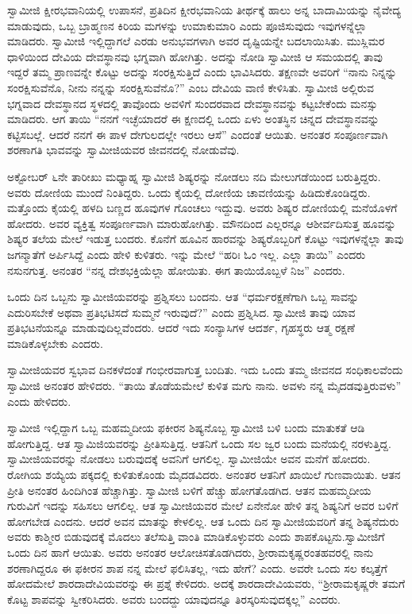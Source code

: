 \vskip 2pt

 ಸ್ವಾಮೀಜಿ ಕ್ಷೀರಭವಾನಿಯಲ್ಲಿ ಉಪಾಸನೆ, ಪ್ರತಿದಿನ ಕ್ಷೀರಭವಾನಿಯ ತೀರ್ಥಕ್ಕೆ ಹಾಲು ಅನ್ನ ಬಾದಾಮಿಯನ್ನು ನೈವೇದ್ಯ ಮಾಡುವುದು, ಒಬ್ಬ ಬ್ರಾಹ್ಮಣನ ಕಿರಿಯ ಮಗಳನ್ನು ಉಮಾಕುಮಾರಿ ಎಂದು ಪೂಜಿಸುವುದು ಇವುಗಳನ್ನೆಲ್ಲಾ ಮಾಡಿದರು. ಸ್ವಾಮೀಜಿ ಇಲ್ಲಿದ್ದಾಗಲೆ ಎರಡು ಅನುಭವಗಳಾಗಿ ಅವರ ದೃಷ್ಟಿಯನ್ನೇ ಬದಲಾಯಿಸಿತು. ಮುಸ್ಲಿಮರ ಧಾಳಿಯಿಂದ ದೇವಿಯ ದೇವಸ್ಥಾನವು ಭಗ್ನವಾಗಿ ಹೋಗಿತ್ತು. ಅದನ್ನು ನೋಡಿ ಸ್ವಾಮೀಜಿ ಆ ಸಮಯದಲ್ಲಿ ತಾವು ಇದ್ದರೆ ತಮ್ಮ ಪ್ರಾಣವನ್ನೇ ಕೊಟ್ಟು ಅದನ್ನು ಸಂರಕ್ಷಿಸುತ್ತಿದೆ ಎಂದು ಭಾವಿಸಿದರು. ತಕ್ಷಣವೇ ಅವರಿಗೆ “ನಾನು ನಿನ್ನನ್ನು ಸಂರಕ್ಷಿಸುವೆನೊ, ನೀನು ನನ್ನನ್ನು ಸಂರಕ್ಷಿಸುವೆನೊ?” ಎಂಬ ದೇವಿಯ ವಾಣಿ ಕೇಳಿಸಿತು. ಸ್ವಾಮೀಜಿ ಅಲ್ಲಿರುವ ಭಗ್ನವಾದ ದೇವಸ್ಥಾನದ ಸ್ಥಳದಲ್ಲಿ ತಾವೊಂದು ಅವಳಿಗೆ ಸುಂದರವಾದ ದೇವಸ್ಥಾನವನ್ನು ಕಟ್ಟಬೇಕೆಂದು ಮನಸ್ಸು ಮಾಡಿದರು. ಆಗ ತಾಯಿ “ನನಗೆ ಇಚ್ಛೆಯಾದರೆ ಈ ಕ್ಷಣದಲ್ಲಿ ಒಂದು ಏಳು ಅಂತಸ್ಥಿನ ಚಿನ್ನದ ದೇವಸ್ಥಾನವನ್ನು ಕಟ್ಟಿಸಬಲ್ಲೆ. ಆದರೆ ನನಗೆ ಈ ಪಾಳ ದೇಗುಲದಲ್ಲೇ ಇರಲು ಆಸೆ” ಎಂದಂತೆ ಆಯಿತು. ಅನಂತರ ಸಂಪೂರ್ಣವಾಗಿ ಶರಣಾಗತಿ ಭಾವವನ್ನು ಸ್ವಾಮೀಜಿಯವರ ಜೀವನದಲ್ಲಿ ನೋಡುವೆವು. 

 ಅಕ್ಟೋಬರ್ ೬ನೇ ತಾರೀಖು ಮಧ್ಯಾಹ್ನ ಸ್ವಾಮೀಜಿ ಶಿಷ್ಯರನ್ನು ನೋಡಲು ನದಿ ಮೇಲುಗಡೆಯಿಂದ ಬರುತ್ತಿದ್ದರು. ಅವರು ದೋಣಿಯ ಮುಂದೆ ನಿಂತಿದ್ದರು. ಒಂದು ಕೈಯಲ್ಲಿ ದೋಣಿಯ ಚಾವಣಿಯನ್ನು ಹಿಡಿದುಕೊಂಡಿದ್ದರು. ಮತ್ತೊಂದು ಕೈಯಲ್ಲಿ ಹಳದಿ ಬಣ್ಣದ ಹೂವುಗಳ ಗೊಂಚಲು ಇದ್ದುವು. ಅವರು ಶಿಷ್ಯರ ದೋಣಿಯಲ್ಲಿ ಮನೆಯೊಳಗೆ ಹೋದರು. ಅವರ ವ್ಯಕ್ತಿತ್ವ ಸಂಪೂರ್ಣವಾಗಿ ಮಾರುಹೋಗಿತ್ತು. ಮೌನದಿಂದ ಎಲ್ಲರನ್ನೂ ಆಶೀರ್ವದಿಸುತ್ತ ಹೂವನ್ನು ಶಿಷ್ಯರ ತಲೆಯ ಮೇಲೆ ಇಡುತ್ತ ಬಂದರು. ಕೊನೆಗೆ ಹೂವಿನ ಹಾರವನ್ನು ಶಿಷ್ಯರೊಬ್ಬರಿಗೆ ಕೊಟ್ಟು ಇವುಗಳನ್ನೆಲ್ಲಾ ತಾವು ಜಗನ್ಮಾತೆಗೆ ಅರ್ಪಿಸಿದ್ದೆ ಎಂದು ಹೇಳಿ ಕುಳಿತರು. ಇನ್ನು ಮೇಲೆ “ಹರಿಃ ಓಂ ಇಲ್ಲ. ಎಲ್ಲಾ ತಾಯಿ” ಎಂದರು ನಸುನಗುತ್ತ. ಅನಂತರ “ನನ್ನ ದೇಶಭಕ್ತಿಯೆಲ್ಲಾ ಹೋಯಿತು. ಈಗ ತಾಯಿಯೊಬ್ಬಳೆ ನಿಜ” ಎಂದರು. 

 ಒಂದು ದಿನ ಒಬ್ಬನು ಸ್ವಾಮೀಜಿಯವರನ್ನು ಪ್ರಶ್ನಿಸಲು ಬಂದನು. ಆತ “ಧರ್ಮರಕ್ಷಣೆಗಾಗಿ ಒಬ್ಬ ಸಾವನ್ನು ಎದುರಿಸಬೇಕೆ ಅಥವಾ ಪ್ರತಿಭಟಿಸದೆ ಸುಮ್ಮನೆ ಇರುವುದೆ?” ಎಂದು ಪ್ರಶ್ನಿಸಿದ. ಸ್ವಾಮೀಜಿ ತಾವು ಯಾವ ಪ್ರತಿಭಟನೆಯನ್ನೂ ಮಾಡುವುದಿಲ್ಲವೆಂದರು. ಆದರೆ ಇದು ಸಂನ್ಯಾಸಿಗಳ ಆದರ್ಶ, ಗೃಹಸ್ಥರು ಆತ್ಮ ರಕ್ಷಣೆ ಮಾಡಿಕೊಳ್ಳಬೇಕು ಎಂದರು. 

 ಸ್ವಾಮೀಜಿಯವರ ಸ್ವಭಾವ ದಿನಕಳೆದಂತೆ ಗಂಭೀರವಾಗುತ್ತ ಬಂದಿತು. ಇದು ಒಂದು ತಮ್ಮ ಜೀವನದ ಸಂಧಿಕಾಲವೆಂದು ಸ್ವಾಮೀಜಿ ಅನಂತರ ಹೇಳಿದರು. “ತಾಯಿ ತೊಡೆಯಮೇಲೆ ಕುಳಿತ ಮಗು ನಾನು. ಅವಳು ನನ್ನ ಮೈದಡವುತ್ತಿರುವಳು” ಎಂದು ಹೇಳಿದರು. 

 ಸ್ವಾಮೀಜಿ ಇಲ್ಲಿದ್ದಾಗ ಒಬ್ಬ ಮಹಮ್ಮದೀಯ ಫಕೀರನ ಶಿಷ್ಯನೊಬ್ಬ ಸ್ವಾಮೀಜಿ ಬಳಿ ಬಂದು ಮಾತುಕತೆ ಆಡಿ ಹೋಗುತ್ತಿದ್ದ. ಆತ ಸ್ವಾಮಿಜಿಯವರನ್ನು ಪ್ರೀತಿಸುತ್ತಿದ್ದ. ಆತನಿಗೆ ಒಂದು ಸಲ ಜ್ವರ ಬಂದು ಮನೆಯಲ್ಲಿ ನರಳುತ್ತಿದ್ದ. ಸ್ವಾಮೀಜಿಯವರನ್ನು ನೋಡಲು ಬರುವುದಕ್ಕೆ ಅವನಿಗೆ ಆಗಲಿಲ್ಲ. ಸ್ವಾಮೀಜಿಯೇ ಅವನ ಮನೆಗೆ ಹೋದರು. ರೋಗಿಯ ಶಯ್ಯೆಯ ಪಕ್ಕದಲ್ಲಿ ಕುಳಿತುಕೊಂಡು ಮೈದಡವಿದರು. ಅನಂತರ ಆತನಿಗೆ ಖಾಯಿಲೆ ಗುಣವಾಯಿತು. ಆತನ ಪ್ರೀತಿ ಅನಂತರ ಹಿಂದಿಗಿಂತ ಹೆಚ್ಚಾಗಿತ್ತು. ಸ್ವಾಮೀಜಿ ಬಳಿಗೆ ಹೆಚ್ಚು ಹೋಗತೊಡಗಿದ. ಆತನ ಮಹಮ್ಮದೀಯ ಗುರುವಿಗೆ ಇದನ್ನು ಸಹಿಸಲು ಆಗಲಿಲ್ಲ. ಆತ ಸ್ವಾಮೀಜಿಯವರ ಮೇಲೆ ಏನೇನೋ ಹೇಳಿ ತನ್ನ ಶಿಷ್ಯನಿಗೆ ಅವರ ಬಳಿಗೆ ಹೋಗಬೇಡ ಎಂದನು. ಆದರೆ ಅವನ ಮಾತನ್ನು ಕೇಳಲಿಲ್ಲ. ಆತ ಒಂದು ದಿನ ಸ್ವಾಮೀಜಿಯವರಿಗೆ ತನ್ನ ಶಿಷ್ಯನೆದುರು ಅವರು ಕಾಶ್ಮೀರ ಬಿಡುವುದಕ್ಕೆ ಮೊದಲು ತಲೆಸುತ್ತಿ ವಾಂತಿ ಮಾಡಿಕೊಳ್ಳುವರು ಎಂದು ಶಾಪಕೊಟ್ಟನು.\break ಸ್ವಾಮೀಜಿಗೆ ಒಂದು ದಿನ ಹಾಗೆ ಆಯಿತು. ಅವರು ಅನಂತರ ಆಲೋಚಿಸತೊಡಗಿದರು, ಶ‍್ರೀರಾಮಕೃಷ್ಣರಂತಹವರಲ್ಲಿ ನಾನು ಶರಣಾಗಿದ್ದರೂ ಈ ಫಕೀರನ ಶಾಪ ನನ್ನ ಮೇಲೆ ಫಲಿಸಿತಲ್ಲ, ಇದು ಹೇಗೆ? ಎಂದು. ಅವರೇ ಒಂದು ಸಲ ಕಲ್ಕತ್ತೆಗೆ ಹೋದಮೇಲೆ ಶಾರದಾದೇವಿಯವರನ್ನು ಈ ಪ್ರಶ್ನೆ ಕೇಳಿದರು. ಅದಕ್ಕೆ ಶಾರದಾದೇವಿಯವರು, “ಶ‍್ರೀರಾಮಕೃಷ್ಣರೇ ತಮಗೆ ಕೊಟ್ಟ ಶಾಪವನ್ನು ಸ್ವೀಕರಿಸಿದರು. ಅವರು ಬಂದದ್ದು ಯಾವುದನ್ನೂ ತಿರಸ್ಕರಿಸುವುದಕ್ಕಲ್ಲ” ಎಂದರು. 

